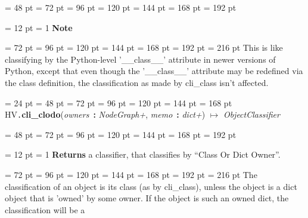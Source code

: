 {{{{{\par}
\par}
{\par \noindent  \leftskip = 48 pt  \leftmargini = 72 pt  \leftmarginii = 96 pt  \leftmarginiii = 120 pt  \leftmarginiv = 144 pt  \leftmarginv = 168 pt  \leftmarginvi = 192 pt {\par \noindent
{\par \pagebreak[3.100000] \noindent \hangindent = 12 pt \hangafter = 1 
{\bf Note\/}\par}
{\par \noindent  \leftskip = 72 pt  \leftmargini = 96 pt  \leftmarginii = 120 pt  \leftmarginiii = 144 pt  \leftmarginiv = 168 pt  \leftmarginv = 192 pt  \leftmarginvi = 216 pt This is like classifying by the Python-level '{\_}{\_}class{\_}{\_}' attribute
in newer versions of Python, except that even though the '{\_}{\_}class{\_}{\_}'
attribute may be redefined via the class definition, the classification
as made by cli{\_}class isn't affected.\par}
\par}
\par}
\par}
\par}
{\par \noindent  \leftskip = 24 pt  \leftmargini = 48 pt  \leftmarginii = 72 pt  \leftmarginiii = 96 pt  \leftmarginiv = 120 pt  \leftmarginv = 144 pt  \leftmarginvi = 168 pt HV{\tt .\/}{\bf {\large {\bf cli{\_}clodo\/}}\/}({\em owners\/}~{\bf :}  {\em NodeGraph+\/}, {\em memo\/}~{\bf :}  {\em dict+\/}) \(\mapsto \)  {\em ObjectClassifier\/}{\par \noindent
{\par \noindent  \leftskip = 48 pt  \leftmargini = 72 pt  \leftmarginii = 96 pt  \leftmarginiii = 120 pt  \leftmarginiv = 144 pt  \leftmarginv = 168 pt  \leftmarginvi = 192 pt {\par \noindent
{\par \pagebreak[3.100000] \noindent \hangindent = 12 pt \hangafter = 1 
{\bf Returns \/} a classifier, that classifies by ``Class Or Dict Owner''.\par}
{\par \noindent  \leftskip = 72 pt  \leftmargini = 96 pt  \leftmarginii = 120 pt  \leftmarginiii = 144 pt  \leftmarginiv = 168 pt  \leftmarginv = 192 pt  \leftmarginvi = 216 pt The classification of an object is its class (as by cli{\_}class),
unless the object is a dict object that is 'owned' by some owner.
If the object is such an owned dict, the classification will be a
}}}}}}
